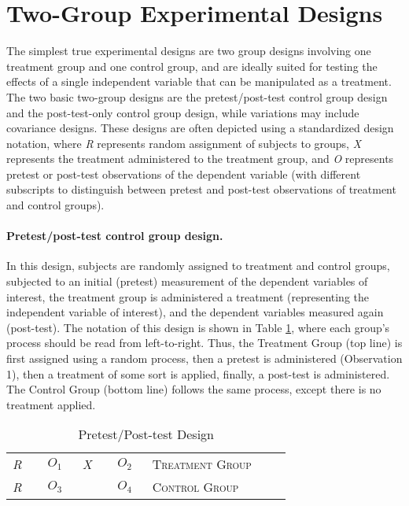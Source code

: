 \section{Two-Group Experimental Designs}

The simplest true experimental designs are two group designs involving one treatment group and one control group, and are ideally suited for testing the effects of a single independent variable that can be manipulated as a treatment. The two basic two-group designs are the pretest/post-test control group design and the post-test-only control group design, while variations may include covariance designs. These designs are often depicted using a standardized design notation, where \textit{R} represents random assignment of subjects to groups, \textit{X} represents the treatment administered to the treatment group, and \textit{O} represents pretest or post-test observations of the dependent variable (with different subscripts to distinguish between pretest and post-test observations of treatment and control groups).

\paragraph{Pretest/post-test control group design.} In this design, subjects are randomly assigned to treatment and control groups, subjected to an initial (pretest) measurement of the dependent variables of interest, the treatment group is administered a treatment (representing the independent variable of interest), and the dependent variables measured again (post-test). The notation of this design is shown in Table \ref{09:tab01}, where each group's process should be read from left-to-right. Thus, the Treatment Group (top line) is first assigned using a random process, then a pretest is administered (Observation 1), then a treatment of some sort is applied, finally, a post-test is administered. The Control Group (bottom line) follows the same process, except there is no treatment applied.

\begin{table}[H]
	\centering
	\begin{tabularx}{0.85\linewidth}{p{0.10\linewidth}p{0.10\linewidth}p{0.10\linewidth}p{0.10\linewidth}p{0.40\linewidth}}
		\toprule
		\textit{R} & $ O_1 $ & \textit{X} & $ O_2 $ & \textsc{Treatment Group} \\
		\textit{R} & $ O_3 $ &            & $ O_4 $ & \textsc{Control Group} \\
		\bottomrule
	\end{tabularx}
	\caption{Pretest/Post-test Design}
	\label{09:tab01}
\end{table}

